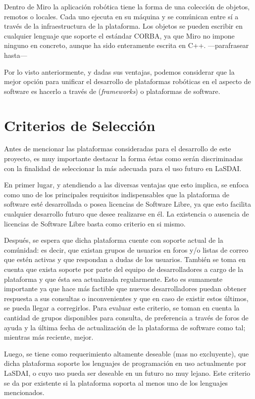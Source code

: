 \begin{itemize}
	Dentro de Miro la aplicación robótica tiene la forma de una colección de objetos, remotos o locales. Cada uno ejecuta en su máquina y se comúnican entre sí a través de la infraestructura de la plataforma. Los objetos se pueden escribir en cualquier lenguaje que soporte el estándar CORBA, ya que Miro no impone ninguno en concreto, aunque ha sido enteramente escrita en C++.
---parafrasear hasta---
\end{itemize}

Por lo visto anteriormente, y dadas sus ventajas, podemos considerar que la mejor opción para unificar el desarrollo de plataformas robóticas en el aspecto de software es hacerlo a través de (\textit{frameworks}) o plataformas de software.

\section{Criterios de Selección}

Antes de mencionar las plataformas consideradas para el desarrollo de este proyecto, es muy importante destacar la forma éstas como serán discriminadas con la finalidad de seleccionar la más adecuada para el uso futuro en LaSDAI.

En primer lugar, y atendiendo a las diversas ventajas que esto implica, se enfoca como uno de los principales requisitos indispensables que la plataforma de software esté desarrollada o posea licencias de Software Libre, ya que esto facilita cualquier desarrollo futuro que desee realizarse en él. La existencia o ausencia de licencias de Software Libre basta como criterio en si mismo.

Después, se espera que dicha plataforma cuente con soporte actual de la comúnidad: es decir, que existan grupos de usuarios en foros y/o listas de correo que estén activas y que respondan a dudas de los usuarios. También se toma en cuenta que exista soporte por parte del equipo de desarrolladores a cargo de la plataforma y que ésta sea actualizada regularmente. Esto es sumamente importante ya que hace más factible que nuevos desarrolladores puedan obtener respuesta a sus consultas o inconvenientes y que en caso de existir estos últimos, se pueda llegar a corregirlos. Para evaluar este criterio, se toman en cuenta la cantidad de grupos disponibles para consulta, de preferencia a través de foros de ayuda y la última fecha de actualización de la plataforma de software como tal; mientras más reciente, mejor.

Luego, se tiene como requerimiento altamente deseable (mas no excluyente), que dicha plataforma soporte los lenguajes de programación en uso actualmente por LaSDAI, o cuyo uso pueda ser deseable en un futuro no muy lejano. Este criterio se da por existente si la plataforma soporta al menos uno de los lenguajes mencionados.

